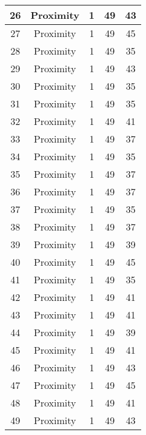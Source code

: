 \documentclass[results.tex]{subfiles}
\begin{document}
\begin{center}
\begin{tabular}{| c || c | c | c | c |}
    \hline
    26 & Proximity & 1 & 49 & 43 \\ 
    \hline
    27 & Proximity & 1 & 49 & 45 \\ 
    \hline
    28 & Proximity & 1 & 49 & 35 \\ 
    \hline
    29 & Proximity & 1 & 49 & 43 \\ 
    \hline
    30 & Proximity & 1 & 49 & 35 \\ 
    \hline
    31 & Proximity & 1 & 49 & 35 \\ 
    \hline
    32 & Proximity & 1 & 49 & 41 \\ 
    \hline
    33 & Proximity & 1 & 49 & 37 \\ 
    \hline
    34 & Proximity & 1 & 49 & 35 \\ 
    \hline
    35 & Proximity & 1 & 49 & 37 \\ 
    \hline
    36 & Proximity & 1 & 49 & 37 \\ 
    \hline
    37 & Proximity & 1 & 49 & 35 \\ 
    \hline
    38 & Proximity & 1 & 49 & 37 \\ 
    \hline
    39 & Proximity & 1 & 49 & 39 \\ 
    \hline
    40 & Proximity & 1 & 49 & 45 \\ 
    \hline
    41 & Proximity & 1 & 49 & 35 \\ 
    \hline
    42 & Proximity & 1 & 49 & 41 \\ 
    \hline
    43 & Proximity & 1 & 49 & 41 \\ 
    \hline
    44 & Proximity & 1 & 49 & 39 \\ 
    \hline
    45 & Proximity & 1 & 49 & 41 \\ 
    \hline
    46 & Proximity & 1 & 49 & 43 \\ 
    \hline
    47 & Proximity & 1 & 49 & 45 \\ 
    \hline
    48 & Proximity & 1 & 49 & 41 \\ 
    \hline
    49 & Proximity & 1 & 49 & 43 \\ 
    \hline   \end{tabular}
\end{center}
\end{document}
